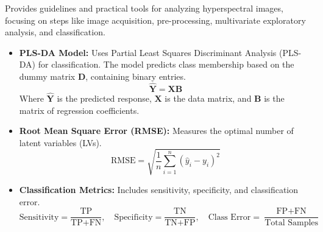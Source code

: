\documentclass[10pt,svgnames,fragile]{beamer}
\begin{document}
\begin{frame}{}
\begin{itemize}
    {\color{gray}Provides guidelines and practical tools for analyzing hyperspectral images, focusing on steps like image acquisition, pre-processing, multivariate exploratory analysis, and classification.}
    \begin{itemize} \tiny
    \item \textbf{PLS-DA Model:} Uses Partial Least Squares Discriminant Analysis (PLS-DA) for classification. The model predicts class membership based on the dummy matrix \( \mathbf{D} \), containing binary entries.
    \[
    \hat{\mathbf{Y}} = \mathbf{X} \mathbf{B}
    \]
    Where \( \hat{\mathbf{Y}} \) is the predicted response, \( \mathbf{X} \) is the data matrix, and \( \mathbf{B} \) is the matrix of regression coefficients.
    \item \textbf{Root Mean Square Error (RMSE):} Measures the optimal number of latent variables (LVs).
    \[
    \text{RMSE} = \sqrt{\frac{1}{n} \sum_{i=1}^{n} (\hat{y}_i - y_i)^2}
    \]
    \item \textbf{Classification Metrics:} Includes sensitivity, specificity, and classification error.
    \[
    \text{Sensitivity} = \frac{\text{TP}}{\text{TP} + \text{FN}}, \quad \text{Specificity} = \frac{\text{TN}}{\text{TN} + \text{FP}}, \quad \text{Class Error} = \frac{\text{FP} + \text{FN}}{\text{Total Samples}}
    \]
\end{itemize}

\end{itemize}
\end{frame}
\end{document}
